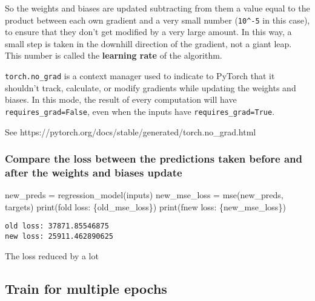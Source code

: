 \documentclass[
  letterpaper,
  DIV=11,
  numbers=noendperiod]{scrartcl}
\newenvironment{Shaded}{\begin{snugshade}}{\end{snugshade}}
\newcommand{\BuiltInTok}[1]{\textcolor[rgb]{0.00,0.23,0.31}{#1}}
\newcommand{\NormalTok}[1]{\textcolor[rgb]{0.00,0.23,0.31}{#1}}
\newcommand{\OperatorTok}[1]{\textcolor[rgb]{0.37,0.37,0.37}{#1}}
\newcommand{\SpecialCharTok}[1]{\textcolor[rgb]{0.37,0.37,0.37}{#1}}
\newcommand{\SpecialStringTok}[1]{\textcolor[rgb]{0.13,0.47,0.30}{#1}}
\begin{document}
So the weights and biases are updated subtracting from them a value
equal to the product between each own gradient and a very small number
(\texttt{10\^{}-5} in this case), to ensure that they don't get modified
by a very large amount. In this way, a small step is taken in the
downhill direction of the gradient, not a giant leap. This number is
called the \textbf{learning rate} of the algorithm.

\texttt{torch.no\_grad} is a context manager used to indicate to PyTorch
that it shouldn't track, calculate, or modify gradients while updating
the weights and biases. In this mode, the result of every computation
will have \texttt{requires\_grad=False}, even when the inputs have
\texttt{requires\_grad=True}.

See https://pytorch.org/docs/stable/generated/torch.no\_grad.html

\hypertarget{compare-the-loss-between-the-predictions-taken-before-and-after-the-weights-and-biases-update}{%
\subsubsection{Compare the loss between the predictions taken before and
after the weights and biases
update}\label{compare-the-loss-between-the-predictions-taken-before-and-after-the-weights-and-biases-update}}

\begin{Shaded}
\begin{Highlighting}[]
\NormalTok{new\_preds }\OperatorTok{=}\NormalTok{ regression\_model(inputs)}
\NormalTok{new\_mse\_loss }\OperatorTok{=}\NormalTok{ mse(new\_preds, targets)}
\BuiltInTok{print}\NormalTok{(}\SpecialStringTok{f\textquotesingle{}old loss: }\SpecialCharTok{\{}\NormalTok{old\_mse\_loss}\SpecialCharTok{\}}\SpecialStringTok{\textquotesingle{}}\NormalTok{)}
\BuiltInTok{print}\NormalTok{(}\SpecialStringTok{f\textquotesingle{}new loss: }\SpecialCharTok{\{}\NormalTok{new\_mse\_loss}\SpecialCharTok{\}}\SpecialStringTok{\textquotesingle{}}\NormalTok{)}
\end{Highlighting}
\end{Shaded}

\begin{verbatim}
old loss: 37871.85546875
new loss: 25911.462890625
\end{verbatim}

The loss reduced by a lot

\hypertarget{train-for-multiple-epochs}{%
\subsection{Train for multiple epochs}\label{train-for-multiple-epochs}}
\end{document}
